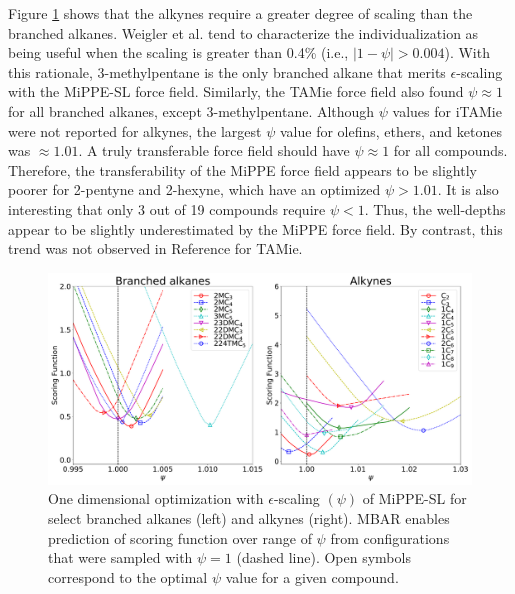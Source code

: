 \documentclass[journal=jced,manuscript=article]{achemso}
\begin{document}

Figure \ref{fig:epsilon_scaling} shows that the alkynes require a greater degree of scaling than the branched alkanes. Weigler et al. tend to characterize the individualization as being useful when the scaling is greater than 0.4\% (i.e., $|1 - \psi| > 0.004$). With this rationale, 3-methylpentane is the only branched alkane that merits $\epsilon$-scaling with the MiPPE-SL force field. Similarly, the TAMie force field also found $\psi \approx 1$ for all branched alkanes, except 3-methylpentane. Although $\psi$ values for iTAMie were not reported for alkynes, the largest $\psi$ value for olefins, ethers, and ketones was $\approx 1.01$. A truly transferable force field should have $\psi \approx 1$ for all compounds. Therefore, the transferability of the MiPPE force field appears to be slightly poorer for 2-pentyne and 2-hexyne, which have an optimized $\psi > 1.01$. It is also interesting that only 3 out of 19 compounds require $\psi < 1$. Thus, the well-depths appear to be slightly underestimated by the MiPPE force field. By contrast, this trend was not observed in Reference  for TAMie. 


	\begin{figure}[htb!]
		\centering
		\includegraphics[width=6.4in]{Optimal_epsilon_scaling.pdf}
		\caption{One dimensional optimization with $\epsilon$-scaling $(\psi)$ of MiPPE-SL for select branched alkanes (left) and alkynes (right). MBAR enables prediction of scoring function over range of $\psi$ from configurations that were sampled with $\psi = 1$ (dashed line). Open symbols correspond to the optimal $\psi$ value for a given compound.}
		\label{fig:epsilon_scaling}
	\end{figure}
\end{document}
